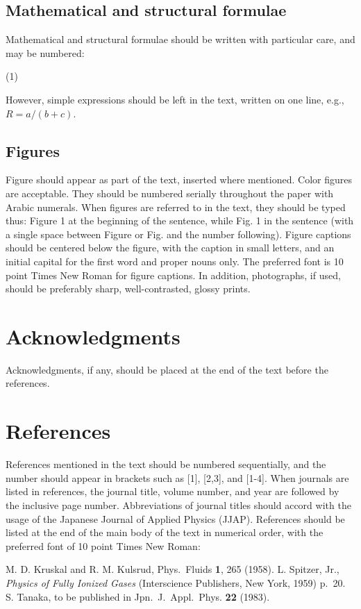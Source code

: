 \documentclass[a4paper,twocolumn,fleqn]{article}
\begin{document}
\subsection{Mathematical and structural formulae }
Mathematical and structural formulae should be written with particular care,
and may be numbered:

            (1)

However, simple expressions should be left in the text, written on one line,
e.g., $R=a/(b+c)$.

\subsection{Figures}
Figure should appear as part of the text, inserted where mentioned.
Color figures are acceptable.
They should be numbered serially throughout the paper with Arabic numerals.
%
When figures are referred to in the text, they should be typed thus:
Figure 1 at the beginning of the sentence, while Fig. 1 in the sentence
(with a single space between Figure or Fig. and the number following).
%
Figure captions should be centered below the figure,
with the caption in small letters,
and an initial capital for the first word and proper nouns only.
%
The preferred font is 10 point Times New Roman for figure captions.
In addition, photographs, if used, should be preferably sharp, well-contrasted, glossy prints.

\section*{Acknowledgments}
Acknowledgments, if any,
should be placed at the end of the text before the references.

\section*{References}
References mentioned in the text should be numbered sequentially,
and the number should appear in brackets such as [1], [2,3], and [1-4].
When journals are listed in references, the journal title, volume number,
and year are followed by the inclusive page number.
%
Abbreviations of journal titles should accord with the usage of the Japanese
Journal of Applied Physics (JJAP).
References should be listed at the end of the main body of the text
in numerical order, with the preferred font of 10 point Times New Roman:

\begin{thebibliography}{9}
  M. D. Kruskal and R. M. Kulsrud, Phys.\ Fluids
  \textbf{1}, 265 (1958).
  L. Spitzer, Jr., \textit{Physics of Fully Ionized Gases}
  (Interscience Publishers, New York, 1959) p.~20.
  S. Tanaka, to be published in Jpn.\ J.\ Appl.\ Phys.
  \textbf{22} (1983).
\end{thebibliography}
\end{document}
